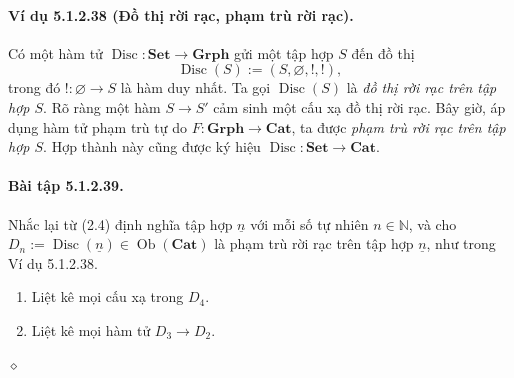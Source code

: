 \paragraph{Ví dụ 5.1.2.38 (Đồ thị rời rạc, phạm trù rời rạc).} Có một hàm tử $\operatorname{Disc}:\mathbf{Set}\to\mathbf{Grph}$ gửi một tập hợp $S$ đến đồ thị
\[\operatorname{Disc}(S):=(S,\varnothing,!,!),\]
trong đó $!:\varnothing\to S$ là hàm duy nhất. Ta gọi $\operatorname{Disc}(S)$ là \emph{đồ thị rời rạc trên tập hợp $S$}. Rõ ràng một hàm $S\to S'$ cảm sinh một cấu xạ đồ thị rời rạc. Bây giờ, áp dụng hàm tử phạm trù tự do $F:\mathbf{Grph}\to\mathbf{Cat}$, ta được \emph{phạm trù rời rạc trên tập hợp $S$}. Hợp thành này cũng được ký hiệu $\operatorname{Disc}:\mathbf{Set}\to\mathbf{Cat}$.
\paragraph{Bài tập 5.1.2.39.} Nhắc lại từ (2.4) định nghĩa tập hợp $\underline n$ với mỗi số tự nhiên $n\in\mathbb N$, và cho $D_n:=\operatorname{Disc}(\underline n)\in\operatorname{Ob}(\mathbf{Cat})$ là phạm trù rời rạc trên tập hợp $\underline n$, như trong Ví dụ 5.1.2.38.
\begin{enumerate}[label=\alph*.]\item Liệt kê mọi cấu xạ trong $D_4$.\item Liệt kê mọi hàm tử $D_3\to D_2$.\end{enumerate}\hfill$\diamond$
